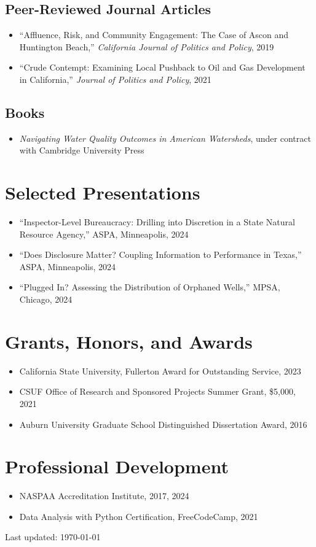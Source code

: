 \documentclass[12pt,letterpaper]{article}
\begin{document}
\subsection*{Peer-Reviewed Journal Articles}
\begin{itemize}
  \item ``Affluence, Risk, and Community Engagement: The Case of Ascon and Huntington Beach,'' \emph{California Journal of Politics and Policy}, 2019
  \item ``Crude Contempt: Examining Local Pushback to Oil and Gas Development in California,'' \emph{Journal of Politics and Policy}, 2021
\end{itemize}

\subsection*{Books}
\begin{itemize}
  \item \emph{Navigating Water Quality Outcomes in American Watersheds}, under contract with Cambridge University Press
\end{itemize}

\section*{Selected Presentations}
\begin{itemize}
  \item ``Inspector-Level Bureaucracy: Drilling into Discretion in a State Natural Resource Agency,'' ASPA, Minneapolis, 2024
  \item ``Does Disclosure Matter? Coupling Information to Performance in Texas,'' ASPA, Minneapolis, 2024
  \item ``Plugged In? Assessing the Distribution of Orphaned Wells,'' MPSA, Chicago, 2024
\end{itemize}

\section*{Grants, Honors, and Awards}
\begin{itemize}
  \item California State University, Fullerton Award for Outstanding Service, 2023
  \item CSUF Office of Research and Sponsored Projects Summer Grant, \$5,000, 2021
  \item Auburn University Graduate School Distinguished Dissertation Award, 2016
\end{itemize}

\section*{Professional Development}
\begin{itemize}
  \item NASPAA Accreditation Institute, 2017, 2024
  \item Data Analysis with Python Certification, FreeCodeCamp, 2021
\end{itemize}

\vspace{2in}
\begin{center}
  \begin{small}
    Last updated: \today
  \end{small}
\end{center}
\end{document}

